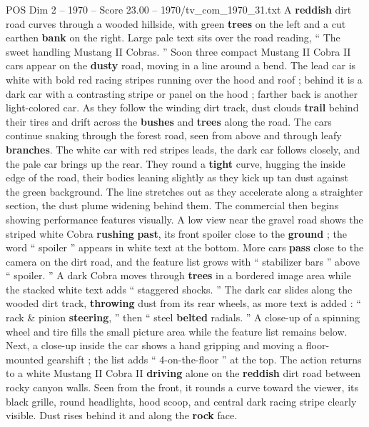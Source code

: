 \begin{textsample}{POS Dim 2 – 1970 – Score 23.00 – 1970/tv\_com\_1970\_31.txt}  \label{ex:f2_pos_071}
A \textbf{reddish} dirt road curves through a wooded hillside, with green \textbf{trees} on the left and a cut earthen \textbf{bank} on the right.
Large pale text sits over the road reading, “ The sweet handling Mustang II Cobras. ” Soon three compact Mustang II Cobra II cars appear on the \textbf{dusty} road, moving in a line around a bend.
The lead car is white with bold red racing stripes running over the hood and roof ; behind it is a dark car with a contrasting stripe or panel on the hood ; farther back is another light-colored car.
As they follow the winding dirt track, dust clouds \textbf{trail} behind their tires and drift across the \textbf{bushes} and \textbf{trees} along the road.
The cars continue snaking through the forest road, seen from above and through leafy \textbf{branches}.
The white car with red stripes leads, the dark car follows closely, and the pale car brings up the rear.
They round a \textbf{tight} curve, hugging the inside edge of the road, their bodies leaning slightly as they kick up tan dust against the green background.
The line stretches out as they accelerate along a straighter section, the dust plume widening behind them.
The commercial then begins showing performance features visually.
A low view near the gravel road shows the striped white Cobra \textbf{rushing} \textbf{past}, its front spoiler close to the \textbf{ground} ; the word “ spoiler ” appears in white text at the bottom.
More cars \textbf{pass} close to the camera on the dirt road, and the feature list grows with “ stabilizer bars ” above “ spoiler. ” A dark Cobra moves through \textbf{trees} in a bordered image area while the stacked white text adds “ staggered shocks. ” The dark car slides along the wooded dirt track, \textbf{throwing} dust from its rear wheels, as more text is added : “ rack \& pinion \textbf{steering}, ” then “ steel \textbf{belted} radials. ” A close-up of a spinning wheel and tire fills the small picture area while the feature list remains below.
Next, a close-up inside the car shows a hand gripping and moving a floor-mounted gearshift ; the list adds “ 4-on-the-floor ” at the top.
The action returns to a white Mustang II Cobra II \textbf{driving} alone on the \textbf{reddish} dirt road between rocky canyon walls.
Seen from the front, it rounds a curve toward the viewer, its black grille, round headlights, hood scoop, and central dark racing stripe clearly visible.
Dust rises behind it and along the \textbf{rock} face.

\end{textsample}
